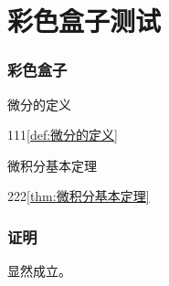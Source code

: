 \section{彩色盒子测试}\label{sec:彩色盒子测试}

\begin{frame}
    \frametitle{彩色盒子}
    \begin{BoxDefinition}[微分的定义]
        微分的定义

        111\cref{def:微分的定义}
    \end{BoxDefinition}

    \begin{BoxTheorem}[微积分基本定理]
        微积分基本定理

        222\cref{thm:微积分基本定理}
    \end{BoxTheorem}
\end{frame}

\begin{frame}
    \frametitle{证明}
    \begin{Proof}
        显然成立。
    \end{Proof}
\end{frame}